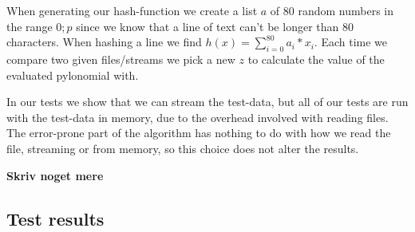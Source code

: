 \documentclass[article,a4paper,oneside]{article}
\newcommand{\+}[1]{\ensuremath{\boldsymbol{#1}}}
\begin{document}
When generating our hash-function we create a list $a$ of 80 random numbers in the range $0;p$ since we know that a line of text can't be longer than 80 characters. When hashing a line we find $h(x) = \sum_{i=0}^{80}a_i*x_i $. Each time we compare two given files/streams we pick a new $z$ to calculate the value of the evaluated pylonomial with.

	In our tests we show that we can stream the test-data, but all of our tests are run with the test-data in memory, due to the overhead involved with reading files. The error-prone part of the algorithm has nothing to do with how we read the file, streaming or from memory, so this choice does not alter the results.

\textbf{Skriv noget mere}


\subsection*{Test results}
\end{document}
